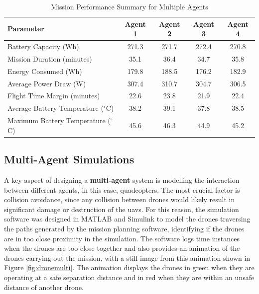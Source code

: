 \begin{table}[H]
\centering
\begin{tabular}{@{}lcccc}
\toprule
\textbf{Parameter}                & \textbf{Agent 1}  & \textbf{Agent 2}  & \textbf{Agent 3}  & \textbf{Agent 4} \\ \midrule
Battery Capacity (Wh)             & 271.3             & 271.7             & 272.4             & 270.8             \\
Mission Duration (minutes)        & 35.1              & 36.4              & 34.7              & 35.8              \\
Energy Consumed (Wh)              & 179.8             & 188.5             & 176.2             & 182.9             \\
Average Power Draw (W)            & 307.4             & 310.7             & 304.7             & 306.5             \\
Flight Time Margin (minutes)      & 22.6              & 23.8              & 21.9              & 22.4              \\
Average Battery Temperature ($^\circ$C) & 38.2              & 39.1              & 37.8              & 38.5              \\
Maximum Battery Temperature ($^\circ$C)    & 45.6              & 46.3              & 44.9              & 45.2              \\
\bottomrule
\end{tabular}
\caption{Mission Performance Summary for Multiple Agents}
\label{tab:mission_summary_extended}
\end{table}

\subsection{Multi-Agent Simulations}

A key aspect of designing a \textbf{multi-agent} system is modelling the interaction between different agents, in this case, quadcopters. The most crucial factor is collision avoidance, since any collision between drones would likely result in significant damage or destruction of the \gls{uav}s. For this reason, the simulation software was designed in MATLAB and Simulink to model the drones traversing the paths generated by the mission planning software, identifying if the drones are in too close proximity in the simulation. The software logs time instances when the drones are too close together and also provides an animation of the drones carrying out the mission, with a still image from this animation shown in Figure \ref{fig:dronemulti}. The animation displays the drones in green when they are operating at a safe separation distance and in red when they are within an unsafe distance of another drone. 

